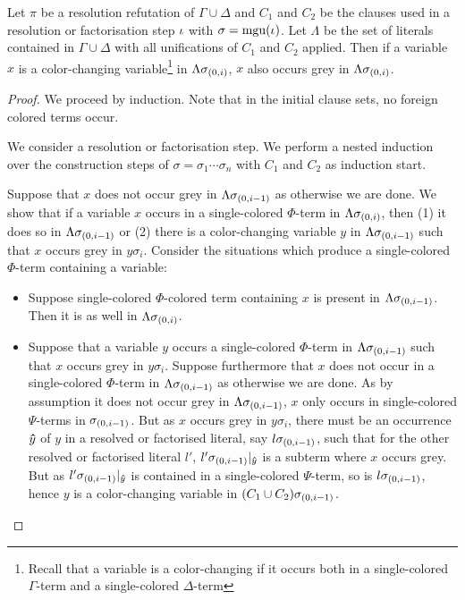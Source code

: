 \documentclass[,%
	draft=false,%
	numbers=noendperiod
	11pt,
	a4paper,
	oneside,%
	openany,
]{memoir}
\begin{document}
\begin{lemma}
	\label{lemma:color_change}
	Let $\pi$ be a resolution refutation of $\Gamma \cup \Delta$ and $C_1$ and $C_2$ be the clauses used in a resolution or factorisation step $\iota$ with $\sigma = \operatorname{mgu}(\iota)$.
	Let $\Lambda$ be the set of literals contained in $\Gamma\cup\Delta$ with all unifications of $C_1$ and $C_2$ applied.
	Then if a variable $x$ is a color-changing variable\footnote{Recall that a variable is a color-changing if it occurs both in a single-colored $\Gamma$-term and a single-colored $\Delta$-term}
	in $\Lambda\sigma_{(0,i)}$,
	$x$ also occurs grey 
	in $\Lambda\sigma_{(0,i)}$.
\end{lemma}
\begin{proof}
	We proceed by induction. Note that in the initial clause sets, no foreign colored terms occur.

	We consider a resolution or factorisation step.
	We perform a nested induction over the construction steps of $\sigma = \sigma_1 \cdots \sigma_n$ with $C_1$ and $C_2$ as induction start.

	Suppose that $x$ does not occur grey in $\Lambda\sigma_{(0,i-1)}$ as otherwise we are done.
	We show that if a variable $x$ occurs in a single-colored $\Phi$-term in $\Lambda\sigma_{(0,i)}$, then (1) it does so in $\Lambda\sigma_{(0,i-1)}$ or (2) there is a color-changing variable $y$ in $\Lambda\sigma_{(0,i-1)}$ such that $x$ occurs grey in $y\sigma_i$.
	Consider the situations which produce a single-colored $\Phi$-term containing a variable:
	\begin{itemize}
		\item Suppose single-colored $\Phi$-colored term containing $x$ is present in $\Lambda\sigma_{(0,i-1)}$. Then it is as well in $\Lambda\sigma_{(0,i)}$.
		\item Suppose that a variable $y$ occurs a single-colored $\Phi$-term in $\Lambda\sigma_{(0,i-1)}$ such that $x$ occurs grey in $y\sigma_i$.
			Suppose furthermore that $x$ does not occur in a single-colored $\Phi$-term in $\Lambda\sigma_{(0,i-1)}$ as otherwise we are done.
			As by assumption it does not occur grey in $\Lambda\sigma_{(0,i-1)}$, $x$ only occurs in single-colored $\Psi$-terms in $\sigma_{(0,i-1)}$.
			But as $x$ occurs grey in $y\sigma_i$, there must be an occurrence $\bm\hat y$ of $y$ in a resolved or factorised literal, say $l\sigma_{(0,i-1)}$, such that for the other resolved or factorised literal $l'$, $l'\sigma_{(0,i-1)}|_{\bm\hat y}$ is a subterm where $x$ occurs grey.
			But as $l'\sigma_{(0,i-1)}|_{\bm\hat y}$ is contained in a single-colored $\Psi$-term, so is $l\sigma_{(0,i-1)}$, hence $y$ is a color-changing variable in $(C_1 \cup C_2)\sigma_{(0,i-1)}$. 


\end{itemize}
\end{proof}
\end{document}
